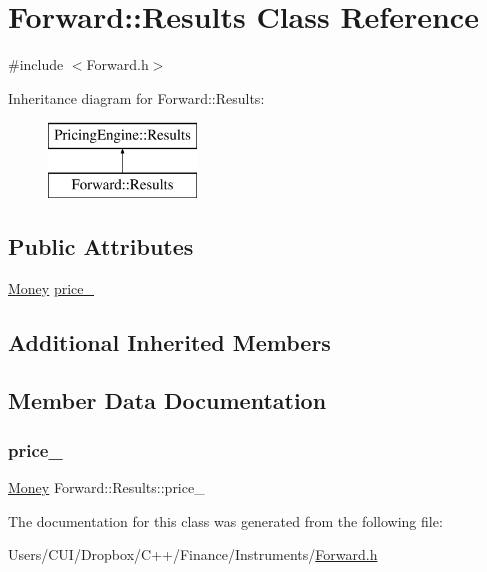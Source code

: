 \hypertarget{class_forward_1_1_results}{}\section{Forward\+:\+:Results Class Reference}
\label{class_forward_1_1_results}


{\ttfamily \#include $<$Forward.\+h$>$}

Inheritance diagram for Forward\+:\+:Results\+:\begin{figure}[H]
\begin{center}
\leavevmode
\includegraphics[height=2.000000cm]{class_forward_1_1_results}
\end{center}
\end{figure}
\subsection*{Public Attributes}
\begin{DoxyCompactItemize}
\item 
\hyperlink{_name_def_8h_a5a9d48c16a694e9a2d9f1eca730dc8c5}{Money} \hyperlink{class_forward_1_1_results_a61aa9829fa13483ef961836334e1d473}{price\+\_\+}
\end{DoxyCompactItemize}
\subsection*{Additional Inherited Members}


\subsection{Member Data Documentation}
\hypertarget{class_forward_1_1_results_a61aa9829fa13483ef961836334e1d473}{}\label{class_forward_1_1_results_a61aa9829fa13483ef961836334e1d473} 
\subsubsection{\texorpdfstring{price\+\_\+}{price\_}}
{\footnotesize\ttfamily \hyperlink{_name_def_8h_a5a9d48c16a694e9a2d9f1eca730dc8c5}{Money} Forward\+::\+Results\+::price\+\_\+}



The documentation for this class was generated from the following file\+:\begin{DoxyCompactItemize}
\item 
Users/\+C\+U\+I/\+Dropbox/\+C++/\+Finance/\+Instruments/\hyperlink{_forward_8h}{Forward.\+h}\end{DoxyCompactItemize}
